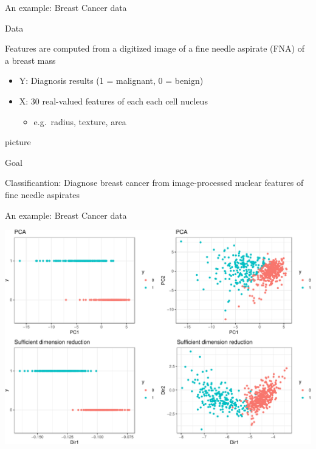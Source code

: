\documentclass[ignorenonframetext,]{beamer}
\providecommand{\tightlist}{%
  \setlength{\itemsep}{0pt}\setlength{\parskip}{0pt}}
\begin{document}
\begin{frame}{An example: Breast Cancer data}

\begin{block}{Data}

Features are computed from a digitized image of a fine needle aspirate
(FNA) of a breast mass

\begin{itemize}
\tightlist
\item
  Y: Diagnosis results (1 = malignant, 0 = benign)
\item
  X: 30 real-valued features of each each cell nucleus

  \begin{itemize}
  \tightlist
  \item
    e.g.~radius, texture, area
  \end{itemize}
\end{itemize}

picture

\end{block}

\begin{block}{Goal}

Classificantion: Diagnose breast cancer from image-processed nuclear
features of fine needle aspirates

\end{block}

\end{frame}

\begin{frame}{An example: Breast Cancer data}

\begin{center}\includegraphics{SDR_reps_slides_final_merck_files/figure-beamer/unnamed-chunk-2-1} \end{center}

\end{frame}
\end{document}

